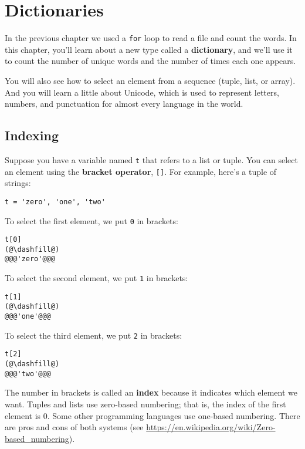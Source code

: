 \hypertarget{dictionaries}{%
\chapter{Dictionaries}\label{dictionaries}}

In the previous chapter we used a \passthrough{\lstinline!for!} loop to
read a file and count the words. In this chapter, you'll learn about a
new type called a \textbf{dictionary}, and we'll use it to count the
number of unique words and the number of times each one appears.

You will also see how to select an element from a sequence (tuple, list,
or array). And you will learn a little about Unicode, which is used to
represent letters, numbers, and punctuation for almost every language in
the world.

\hypertarget{indexing}{%
\section{Indexing}\label{indexing}}

Suppose you have a variable named \passthrough{\lstinline!t!} that
refers to a list or tuple. You can select an element using the
\textbf{bracket operator}, \passthrough{\lstinline![]!}. For example,
here's a tuple of strings:

\begin{lstlisting}[]
t = 'zero', 'one', 'two'
\end{lstlisting}

To select the first element, we put \passthrough{\lstinline!0!} in
brackets:

\begin{lstlisting}[]
t[0]
(@\dashfill@)
@@@'zero'@@@
\end{lstlisting}

To select the second element, we put \passthrough{\lstinline!1!} in
brackets:

\begin{lstlisting}[]
t[1]
(@\dashfill@)
@@@'one'@@@
\end{lstlisting}

To select the third element, we put \passthrough{\lstinline!2!} in
brackets:

\begin{lstlisting}[]
t[2]
(@\dashfill@)
@@@'two'@@@
\end{lstlisting}

The number in brackets is called an \textbf{index} because it indicates
which element we want. Tuples and lists use zero-based numbering; that
is, the index of the first element is 0. Some other programming
languages use one-based numbering. There are pros and cons of both
systems (see \url{https://en.wikipedia.org/wiki/Zero-based_numbering}).

